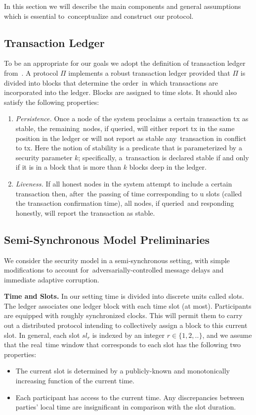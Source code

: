 In this section we will describe the main components and general assumptions which is essential to\
conceptualize and construct our protocol.

\subsection{Transaction Ledger}\label{subsec:transaction-ledger.}
To be an appropriate for our goals we adopt the definition of transaction ledger from~\cite{cryptoeprint:2016/889}.
A protocol $\Pi$ implements a robust transaction ledger provided that $\Pi$ is divided into blocks that determine the order\
in which transactions are incorporated into the ledger.
Blocks are assigned to time slots.
It should also satisfy the following properties:
\begin{enumerate}
    \item \emph{Persistence.} Once a node of the system proclaims a certain transaction tx as stable, the remaining\
    nodes, if queried, will either report tx in the same position in the ledger or will not report as stable any\
    transaction in conflict to tx.
    Here the notion of stability is a predicate that is parameterized by a security parameter $k$; specifically, a\
    transaction is declared stable if and only if it is in a block that is more than $k$ blocks deep in the ledger.
    \item \emph{Liveness.} If all honest nodes in the system attempt to include a certain transaction then, after\
    the passing of time corresponding to u slots (called the transaction confirmation time), all nodes, if queried\
    and responding honestly, will report the transaction as stable.
\end{enumerate}

\subsection{Semi-Synchronous Model Preliminaries}\label{subsec:the-semi-synchronous-model-preliminaries.}
We consider the security model in a semi-synchronous setting, with simple modifications to account for\
adversarially-controlled message delays and immediate adaptive corruption.

\textbf{Time and Slots.}
In our setting time is divided into discrete units called slots.
The ledger associates one ledger block with each time slot (at most).
Participants are equipped with roughly synchronized clocks.
This will permit them to carry out a distributed protocol intending to collectively assign a block to this current slot.
In general, each slot $sl_r$ is indexed by an integer $r \in \{1, 2, ..\}$, and we assume that the real\
time window that corresponds to each slot has the following two properties:
\begin{itemize}
    \item The current slot is determined by a publicly-known and monotonically increasing function of the current time.
    \item Each participant has access to the current time.
    Any discrepancies between parties' local time are insignificant in comparison with the slot duration.
\end{itemize}

